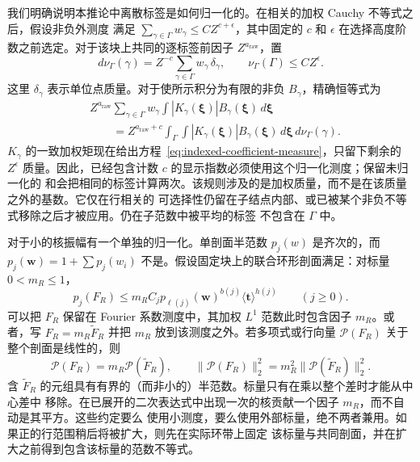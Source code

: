 \documentclass[11pt,a4paper]{article}
\numberwithin{equation}{section}
\numberwithin{figure}{section}
\theoremstyle{definition}
\theoremstyle{remark}
\begin{document}
我们明确说明本推论中离散标签是如何归一化的。在相关的加权 Cauchy 不等式之后，假设非负外测度
满足 $\sum_{\gamma\in\Gamma}w_\gamma\le C Z^{c+\epsilon}$，其中固定的 $c$ 和 $\epsilon$
在选择高度阶数之前选定。对于该块上共同的逐标签前因子 $Z^{a_{\mathrm{raw}}}$，置
\[
 d\nu_\Gamma(\gamma)=Z^{-c}
             \sum_{\gamma\in\Gamma}w_\gamma\,\delta_\gamma,
 \qquad \nu_\Gamma(\Gamma)\le C Z^\epsilon.
\]
这里 $\delta_\gamma$ 表示单位点质量。对于使所示积分为有限的非负 $B_\gamma$，精确恒等式为
\begin{equation}\label{eq:normalized-label-measure}
 \begin{split}
 &Z^{a_{\mathrm{raw}}}\sum_{\gamma\in\Gamma}w_\gamma
              \int |K_\gamma(\boldsymbol\xi)|B_\gamma(\boldsymbol\xi)
                                      \,d\boldsymbol\xi\\
 &\qquad=Z^{a_{\mathrm{raw}}+c}
       \int_\Gamma\int |K_\gamma(\boldsymbol\xi)|B_\gamma(\boldsymbol\xi)
                                      \,d\boldsymbol\xi\,d\nu_\Gamma(\gamma).
 \end{split}
\end{equation}
$K_\gamma$ 的一致加权矩现在给出方程~\eqref{eq:indexed-coefficient-measure}，只留下剩余的
$Z^\epsilon$ 质量。因此，已经包含计数 $c$ 的显示指数必须使用这个归一化测度；保留未归一化的
和会把相同的标签计算两次。该规则涉及的是加权质量，而不是在该质量之外的基数。它仅在行相关的
可选择性仍留在子结点内部、或已被某个非负不等式移除之后才被应用。仍在子范数中被平均的标签
不包含在 $\Gamma$ 中。

对于小的核振幅有一个单独的归一化。单剖面半范数 $p_j(w)$ 是齐次的，而
$p_j(\boldsymbol w)=1+\sum p_j(w_i)$ 不是。假设固定块上的联合环形剖面满足：对标量
$0<m_R\le1$，
\[
 p_j(F_R)\le m_R C_j p_{\ell(j)}(\boldsymbol w)^{b(j)}
                         \langle\boldsymbol t\rangle^{h(j)}
       \qquad(j\ge0).
\]
可以把 $F_R$ 保留在 Fourier 系数测度中，其加权 $L^1$ 范数此时包含因子 $m_R$。或者，写
$F_R=m_R\widetilde F_R$ 并把 $m_R$ 放到该测度之外。若多项式或行向量 $\mathcal P(F_R)$
关于整个剖面是线性的，则
\[
 \mathcal P(F_R)=m_R\mathcal P(\widetilde F_R),\qquad
 \|\mathcal P(F_R)\|_2^2=m_R^2\|\mathcal P(\widetilde F_R)\|_2^2.
\]
含 $\widetilde F_R$ 的元组具有有界的（而非小的）半范数。标量只有在乘以整个差时才能从中心差中
移除。在已展开的二次表达式中出现一次的核贡献一个因子 $m_R$，而不自动是其平方。这些约定要么
使用小测度，要么使用外部标量，绝不两者兼用。如果正的行范围稍后将被扩大，则先在实际环带上固定
该标量与共同剖面，并在扩大之前得到包含该标量的范数不等式。
\end{document}
